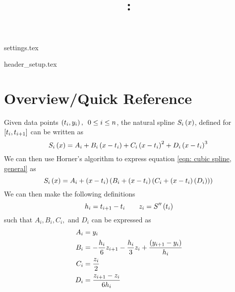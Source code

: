 \documentclass[letterpaper, 10pt, titlepage]{article}
\title{\theTitle\\
\theClass: \theClassName\\
}
\author{\theAuthorName}
\date{\theDueDate}
\newcommand{\pp}{\paren}
\newcommand{\bb}{\brackets}
\begin{document}
\maketitle
{settings.tex}

%

{header_setup.tex}

\section{Overview/Quick Reference}
Given data points $\pp{t_i, y_i},\enspace 0\leq i\leq n$, the natural spline
$S_i\left(x\right)$, defined for $\bb{t_i, t_{i+1}}$ can be written as
\begin{equation}
    \functionof{S_i}{x} = A_i + B_i\pp{x - t_i} + C_i\pp{x - t_i}^2 +
    D_i\pp{x - t_i}^3\\
    \label{eqn: cubic spline, general}
\end{equation}
We can then use Horner's algorithm to express equation
\eqref{eqn: cubic spline, general} as
\begin{equation}
    \functionof{S_i}{x} =
    A_i + \pp{x - t_i}\pp{B_i + \pp{x - t_i}\pp{C_i + \pp{x - t_i}\pp{D_i}}}\\
\end{equation}
We can then make the following definitions
\begin{equation}
    h_i = t_{i+1} - t_i
    \quad\quad
    z_i = S^{\prime\prime}\left(t_i\right)
\end{equation}
such that $A_i, B_i, C_i,$ and $D_i$ can be expressed as
\begin{equation}
    \begin{aligned}
        A_i &= y_i
        \\
        B_i &=
        -\dfrac{h_i}{6}z_{i+1} - \dfrac{h_i}{3}z_i
        + \dfrac{\pp{y_{i+1} - y_i}}{h_i}
        \\
        C_i &= \dfrac{z_i}{2}
        \\
        D_i &= \dfrac{z_{i+1} - z_i}{6h_i}
    \end{aligned}
\end{equation}
\end{document}
